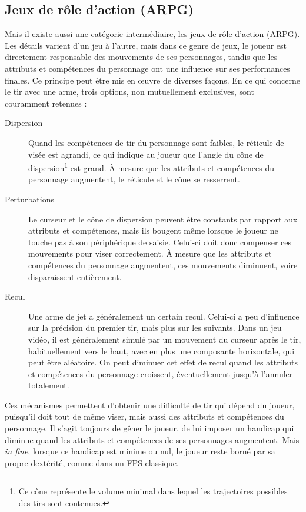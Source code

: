 	\subsection{Jeux de rôle d'action (ARPG)}
	Mais il existe aussi une catégorie intermédiaire, les jeux de rôle d'action (ARPG). Les détails varient d'un jeu à l'autre, mais dans ce genre de jeux, le joueur est directement responsable des mouvements de ses personnages, tandis que les attributs et compétences du personnage ont une influence sur ses performances finales. Ce principe peut être mis en œuvre de diverses façons. En ce qui concerne le tir avec une arme, trois options, non mutuellement exclusives, sont couramment retenues :
	\begin{description}
		\item[Dispersion] Quand les compétences de tir du personnage sont faibles, le réticule de visée est agrandi, ce qui indique au joueur que l'angle du cône de dispersion\footnote{Ce cône représente le volume minimal dans lequel les trajectoires possibles des tirs sont contenues.} est grand. À mesure que les attributs et compétences du personnage augmentent, le réticule et le cône se resserrent.
		\item[Perturbations] Le curseur et le cône de dispersion peuvent être constants par rapport aux attributs et compétences, mais ils bougent même lorsque le joueur ne touche pas à son périphérique de saisie. Celui-ci doit donc compenser ces mouvements pour viser correctement. À mesure que les attributs et compétences du personnage augmentent, ces mouvements diminuent, voire disparaissent entièrement.
		\item[Recul] Une arme de jet a généralement un certain recul. Celui-ci a peu d'influence sur la précision du premier tir, mais plus sur les suivants. Dans un jeu vidéo, il est généralement simulé par un mouvement du curseur après le tir, habituellement vers le haut, avec en plus une composante horizontale, qui peut être aléatoire. On peut diminuer cet effet de recul quand les attributs et compétences du personnage croissent, éventuellement jusqu'à l'annuler totalement.
	\end{description}

	Ces mécanismes permettent d'obtenir une difficulté de tir qui dépend du joueur, puisqu'il doit tout de même viser, mais aussi des attributs et compétences du personnage. Il s'agit toujours de gêner le joueur, de lui imposer un handicap qui diminue quand les attributs et compétences de ses personnages augmentent. Mais \emph{in fine}, lorsque ce handicap est minime ou nul, le joueur reste borné par sa propre dextérité, comme dans un FPS classique.
	
